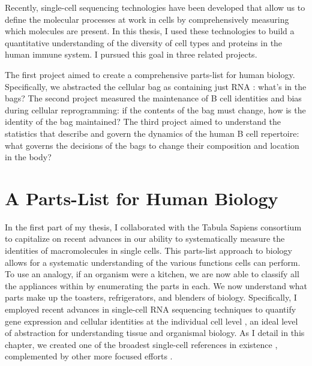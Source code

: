 Recently, single-cell sequencing technologies have been developed that allow us to define the molecular processes at work in cells by comprehensively measuring which molecules are present. In this thesis, I used these technologies to build a quantitative understanding of the diversity of cell types and proteins in the human immune system. I pursued this goal in three related projects.

The first project aimed to create a comprehensive parts-list for human biology. Specifically, we abstracted the cellular bag as containing just RNA \cite{quake2021cell}: what's in the bags? The second project measured the maintenance of B cell identities and bias during cellular reprogramming: if the contents of the bag must change, how is the identity of the bag maintained? The third project aimed to understand the statistics that describe and govern the dynamics of the human B cell repertoire: what governs the decisions of the bags to change their composition and location in the body?


\section{A Parts-List for Human Biology}
In the first part of my thesis, I collaborated with the Tabula Sapiens consortium to capitalize on recent advances in our ability to systematically measure the identities of macromolecules in single cells. This parts-list approach to biology allows for a systematic understanding of the various functions cells can perform. To use an analogy, if an organism were a kitchen, we are now able to classify all the appliances within by enumerating the parts in each. We now understand what parts make up the toasters, refrigerators, and blenders of biology. Specifically, I employed recent advances in single-cell RNA sequencing techniques to quantify gene expression and cellular identities at the individual cell level \cite{klein_droplet_2015, macosko2015highly}, an ideal level of abstraction for understanding tissue and organismal biology. As I detail in this chapter, we created one of the broadest single-cell references in existence \cite{tabula_sapiens_consortium_tabula_2022}, complemented by other more focused efforts \cite{dominguez_conde_cross-tissue_2022}.

